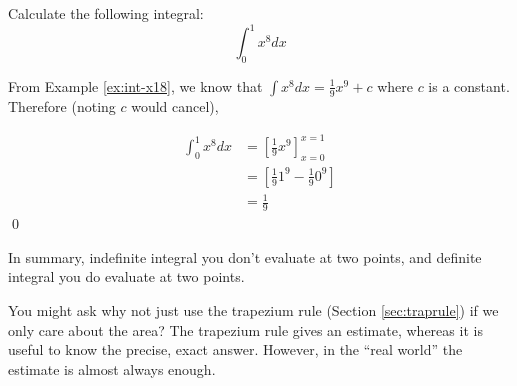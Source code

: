 \begin{example}
    Calculate the following integral:
    \[ \int_{0}^{1} x^8 dx\]
\end{example}
\begin{solution}
    From Example \ref{ex:int-x18}, we know that $\int x^8 dx = \frac{1}{9}x^9 + c$ where $c$ is a constant.
    Therefore (noting $c$ would cancel),

    \begin{align*}
        \int_{0}^{1} x^8 dx & = [\frac{1}{9}x^9]_{x=0}^{x=1} \\ 
          &= [\frac{1}{9}1^9 - \frac{1}{9}0^9] \\
          &= \frac{1}{9}
    \end{align*}
    \qed
\end{solution}

In summary, indefinite integral you don't evaluate at two points, and definite integral you do evaluate at two points.

You might ask why not just use the trapezium rule (Section \ref{sec:traprule}) if we only care about the area? The trapezium rule gives an estimate, whereas it is useful to know the precise, exact answer. However, in the ``real world'' the estimate is almost always enough.

